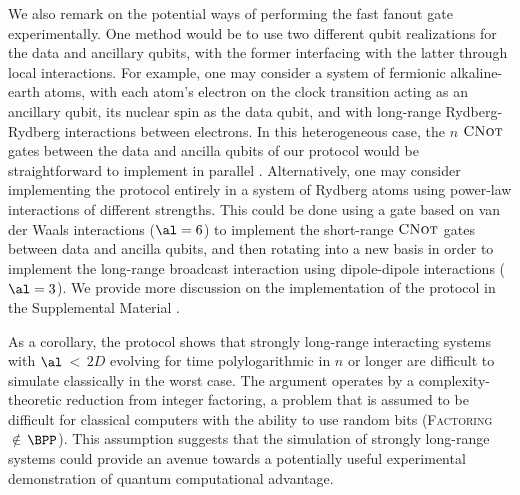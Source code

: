 We also remark on the potential ways of performing the fast fanout gate experimentally.
One method would be to use two different qubit realizations for the data and ancillary qubits,  with the former interfacing with the latter through local interactions.
For example, one may consider a system of fermionic alkaline-earth atoms, with each atom's electron on the clock transition acting as an ancillary qubit, its nuclear spin as the data qubit, and with long-range Rydberg-Rydberg interactions between electrons.
In this heterogeneous case, the $n$ $\textsc{CNot}$ gates between the data and ancilla qubits of our protocol would be straightforward to implement in parallel \cite{Gorshkov2009}.
Alternatively, one may consider implementing the protocol entirely in a system of Rydberg atoms using power-law interactions of different strengths.
This could be done using a gate based on %
van der Waals interactions ($\al = 6$) to implement the short-range $\textsc{CNot}$ gates between data and ancilla qubits, and then rotating into a new basis in order to implement the long-range broadcast interaction using dipole-dipole interactions ($\al = 3$).
We provide more discussion on the implementation of the protocol in the Supplemental Material \cite{SM}.

As
a corollary, the protocol shows that strongly long-range interacting systems with $\al$\,$<$\,$2D$ evolving for time polylogarithmic in $n$ or longer are difficult to simulate classically in the worst case.
The argument operates by a complexity-theoretic reduction from integer factoring, a problem that is assumed to be difficult for classical computers with the ability to use random bits (\textsc{Factoring} $\notin$\,$\BPP$).
This assumption suggests that the simulation of strongly long-range systems could provide an avenue towards a potentially useful experimental demonstration of quantum computational advantage.

